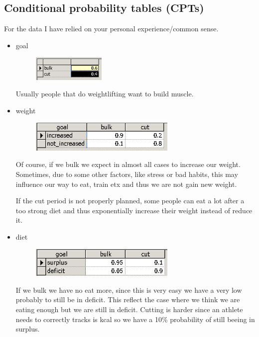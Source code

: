 \documentclass[11pt]{article}
\begin{document}
\subsection{Conditional probability tables (CPTs)}
For the data I have relied on your personal experience/common sense.
\begin{itemize}
\item goal
\begin{figure}[H]
\includegraphics[width=0.33\textwidth]{./images/nodes/definitions/1.png}
\end{figure}
Usually people that do weightlifting want to build muscle. 
\item weight
\begin{figure}[H]
\includegraphics[width=0.66\textwidth]{./images/nodes/definitions/2.png}
\end{figure}
Of course, if we bulk we expect in almost all cases to increase our weight. Sometimes, due to some other factors, like stress or bad habits, this may influence our way to eat, train etx and thus we are not gain new weight. 

If the cut period is not properly planned, some people can eat a lot after a too strong diet and thus exponentially increase their weight instead of reduce it.

\item diet
\begin{figure}[H]
\includegraphics[width=0.66\textwidth]{./images/nodes/definitions/3.png}
\end{figure}

If we bulk we have no eat more, since this is very easy  we have a very low probably to still be in deficit. This reflect the case where we think we are eating enough but we are still in deficit. Cutting is harder since an athlete needs to correctly tracks is kcal so we have a 10\% probability of still beeing in surplus.


\end{itemize}
\end{document}
